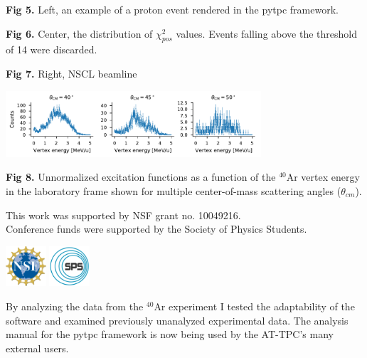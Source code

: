 \documentclass[ansiepaperDNP,portrait]{baposter}
\begin{document}
\begin{poster}
{\small{\textbf{Fig 5.} Left, an example of a proton event rendered in the pytpc framework.}

\small{\textbf{Fig 6.} Center, the distribution of $\chi_{pos}^{2}$ values. Events falling above the threshold of 14 were discarded.}

\small{\textbf{Fig 7.} Right, NSCL beamline}

\begin{center}
\includegraphics [width=95mm] {angular_excitation_hists_POSTER.pdf}
\end{center}
\small{\textbf{Fig 8.} Unnormalized excitation functions as a function of the $^{40}$Ar vertex energy in the laboratory frame shown for multiple center-of-mass scattering angles ($\theta_{cm}$).}
}

{\small{This work was supported by NSF grant no. 10049216.\\ Conference funds were supported by the Society of Physics Students.
}

\includegraphics[height=15mm]{nsf_logo.png}
\hspace{.75cm}
\includegraphics [height=15mm]{sps_logo.png}


}
{\small{By analyzing the data from the $^{40}$Ar experiment I tested the adaptability of the software and examined previously unanalyzed experimental data. The analysis manual for the pytpc framework is now being used by the AT-TPC's many external users.

}}
\end{poster}
\end{document}
